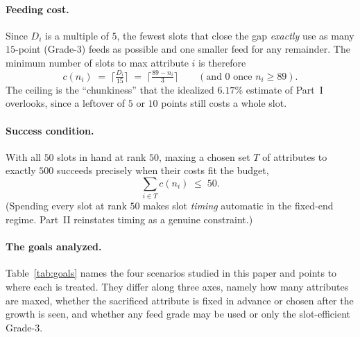 \documentclass[11pt]{article}
\theoremstyle{remark}
\begin{document}
\paragraph{Feeding cost.}
Since $D_i$ is a multiple of $5$, the fewest slots that close the gap \emph{exactly}
use as many $15$-point (Grade-3) feeds as possible and one smaller feed for any
remainder. The minimum number of slots to max attribute $i$ is therefore
\begin{equation}\label{eq:cost}
   c(n_i) \;=\; \Big\lceil \tfrac{D_i}{15}\Big\rceil
            \;=\; \Big\lceil \tfrac{89-n_i}{3}\Big\rceil
   \qquad(\text{and }0\text{ once }n_i\ge 89).
\end{equation}
The ceiling is the ``chunkiness'' that the idealized $6.17\%$ estimate of Part~I
overlooks, since a leftover of $5$ or $10$ points still costs a whole slot.

\paragraph{Success condition.}
With all $50$ slots in hand at rank $50$, maxing a chosen set $T$ of attributes to
exactly $500$ succeeds precisely when their costs fit the budget,
\begin{equation}\label{eq:success}
   \sum_{i\in T} c(n_i) \;\le\; 50.
\end{equation}
(Spending every slot at rank $50$ makes slot \emph{timing} automatic in the
fixed-end regime. Part~II reinstates timing as a genuine constraint.)

\paragraph{The goals analyzed.}
Table~\ref{tab:goals} names the four scenarios studied in this paper and points to
where each is treated. They differ along three axes, namely how many attributes are
maxed, whether the sacrificed attribute is fixed in advance or chosen after the
growth is seen, and whether any feed grade may be used or only the slot-efficient
Grade-3.
\end{document}
